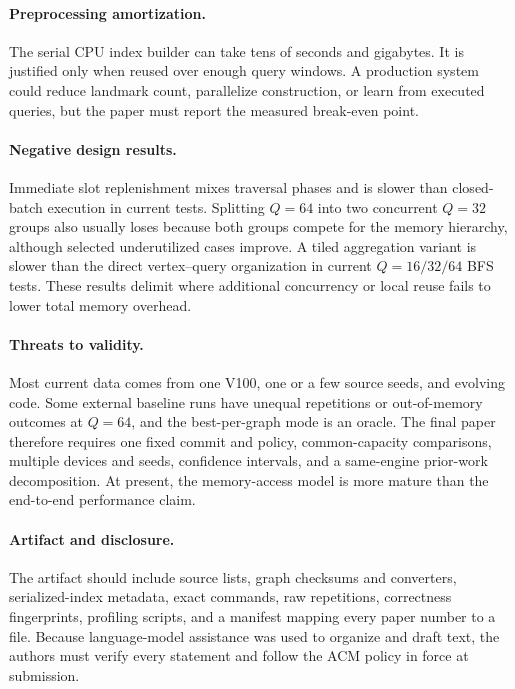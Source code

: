 \paragraph{Preprocessing amortization.}
The serial CPU index builder can take tens of seconds and gigabytes.  It is justified only when reused over enough query windows.  A production system could reduce landmark count, parallelize construction, or learn from executed queries, but the paper must report the measured break-even point.

\paragraph{Negative design results.}
Immediate slot replenishment mixes traversal phases and is slower than closed-batch execution in current tests.  Splitting $Q=64$ into two concurrent $Q=32$ groups also usually loses because both groups compete for the memory hierarchy, although selected underutilized cases improve.  A tiled aggregation variant is slower than the direct vertex--query organization in current $Q=16/32/64$ BFS tests.  These results delimit where additional concurrency or local reuse fails to lower total memory overhead.

\paragraph{Threats to validity.}
Most current data comes from one V100, one or a few source seeds, and evolving code.  Some external baseline runs have unequal repetitions or out-of-memory outcomes at $Q=64$, and the best-per-graph mode is an oracle.  The final paper therefore requires one fixed commit and policy, common-capacity comparisons, multiple devices and seeds, confidence intervals, and a same-engine prior-work decomposition.  At present, the memory-access model is more mature than the end-to-end performance claim.

\paragraph{Artifact and disclosure.}
The artifact should include source lists, graph checksums and converters, serialized-index metadata, exact commands, raw repetitions, correctness fingerprints, profiling scripts, and a manifest mapping every paper number to a file.  Because language-model assistance was used to organize and draft text, the authors must verify every statement and follow the ACM policy in force at submission.
